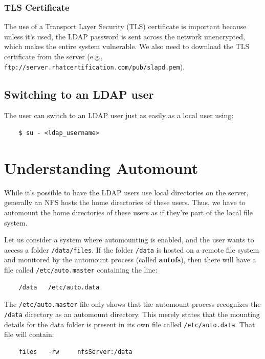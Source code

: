 \documentclass{report}
\begin{document}
	\subsubsection{TLS Certificate}
	The use of a Transport Layer Security (TLS) certificate is important because unless it's used, the LDAP password is sent across the network unencrypted, which makes the entire system vulnerable. We also need to download the TLS certificate from the server (e.g., \verb|ftp://server.rhatcertification.com/pub/slapd.pem|).
	
	\subsection{Switching to an LDAP user}
	The user can switch to an LDAP user just as easily as a local user using:
	
	\begin{verbatim}
	$ su - <ldap_username>
	\end{verbatim}
	
	\section{Understanding Automount}
	While it's possible to have the LDAP users use local directories on the server, generally an NFS hosts the home directories of these users. Thus, we have to automount the home directories of these users as if they're part of the local file system. 
	
	Let us consider a system where automounting is enabled, and the user wants to access a folder \verb|/data/files|. If the folder \verb|/data| is hosted on a remote file system and monitored by the automount process (called \textbf{autofs}), then there will have a file called \verb|/etc/auto.master| containing the line:
	
	\begin{verbatim}
	/data	/etc/auto.data
	\end{verbatim}
	
	The \verb|/etc/auto.master| file only shows that the automount process recognizes the \verb|/data| directory as an automount directory. This merely states that the mounting details for the data folder is present in its own file called \verb|/etc/auto.data|. That file will contain:
	
	\begin{verbatim}
	files	-rw		nfsServer:/data
	\end{verbatim}
	
\end{document}
